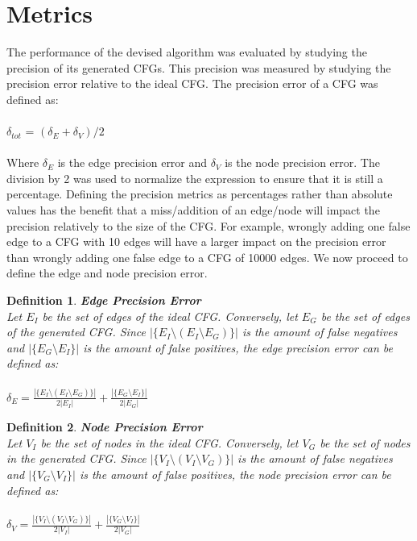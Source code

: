 \documentclass{kththesis}
\newtheorem{definition}{Definition}
\begin{document}
\section{Metrics}
The performance of the devised algorithm was evaluated by studying the precision of its generated CFGs. This precision was measured by studying the precision error relative to the ideal CFG. The precision error of a CFG was defined as:
\\ \\
$\delta_{tot}$ = $(\delta_E+\delta_V)/2$
\\ \\
Where $\delta_E$ is the edge precision error and $\delta_V$ is the node precision error. The division by 2 was used to normalize the expression to ensure that it is still a percentage. Defining the precision metrics as percentages rather than absolute values has the benefit that a miss/addition of an edge/node will impact the precision relatively to the size of the CFG. For example, wrongly adding one false edge to a CFG with 10 edges will have a larger impact on the precision error than wrongly adding one false edge to a CFG of 10000 edges. We now proceed to define the edge and node precision error.
\begin{definition} \textbf{Edge Precision Error}\\
Let $E_I$ be the set of edges of the ideal CFG. Conversely, let $E_G$ be the set of edges of the generated CFG. Since $|\{E_I \setminus (E_I \setminus E_G)\}|$ is the amount of false negatives and $|\{E_G \setminus E_I\}|$ is the amount of false positives, the edge precision error can be defined as:
\\ \\
$\delta_{E}=\frac{|\{E_I \setminus (E_I \setminus E_G)\}|}{2|E_I|}+\frac{|\{E_G \setminus E_I\}|}{2|E_G|}$
\end{definition}
\begin{definition}  \textbf{Node Precision Error}\\
Let $V_I$ be the set of nodes in the ideal CFG. Conversely, let $V_G$ be the set of nodes in the generated CFG. Since $|\{V_I \setminus (V_I \setminus V_G)\}|$ is the amount of false negatives and $|\{V_G \setminus V_I\}|$ is the amount of false positives, the node precision error can be defined as:
\\ \\
$\delta_{V}=\frac{|\{V_I \setminus (V_I \setminus V_G)\}|}{2|V_I|}+\frac{|\{V_G \setminus V_I\}|}{2|V_G|}$
\end{definition}
\end{document}
